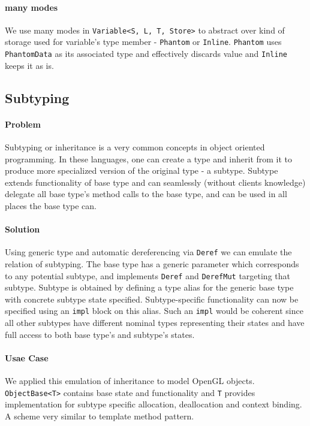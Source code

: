 \paragraph{many modes}

We use many modes in \texttt{Variable<S, L, T, Store>} to abstract over kind of storage used for variable's type member - \texttt{Phantom} or \texttt{Inline}.
\texttt{Phantom} uses \texttt{PhantomData} as its associated type and effectively discards value and \texttt{Inline} keeps it as is.

\subsection{Subtyping}

\paragraph{Problem}

Subtyping or inheritance is a very common concepts in object oriented programming. 
In these languages, one can create a type and inherit from it to produce more specialized version of the original type - a subtype.
Subtype extends functionality of base type and can seamlessly (without clients knowledge) delegate all base type's method calls to the base type, and can be used in all places the base type can.

\paragraph{Solution}

Using generic type and automatic dereferencing via \texttt{Deref} we can emulate the relation of subtyping.
The base type has a generic parameter which corresponds to any potential subtype, and implements \texttt{Deref} and \texttt{DerefMut} targeting that subtype.
Subtype is obtained by defining a type alias for the generic base type with concrete subtype state specified.
Subtype-specific functionality can now be specified using an \texttt{impl} block on this alias. 
Such an \texttt{impl} would be coherent since all other subtypes have different nominal types representing their states and have full access to both base type's and subtype's states.

\paragraph{Usae Case}

We applied this emulation of inheritance to model OpenGL objects. \texttt{ObjectBase<T>} contains base state and functionality and \texttt{T} provides implementation for subtype specific allocation, deallocation and context binding.
A scheme very similar to template method pattern.

